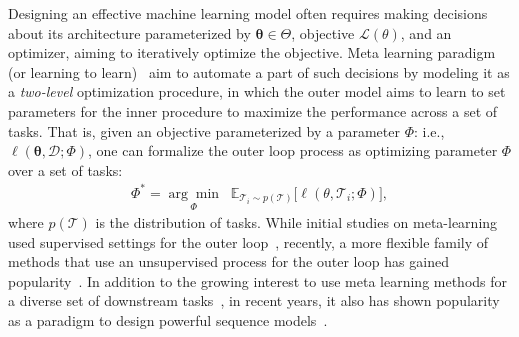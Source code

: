 Designing an effective machine learning model often requires making decisions about its architecture parameterized by $\boldsymbol{\theta} \in \Theta$, objective $\mathcal{L}(\theta)$, and an optimizer, aiming to iteratively optimize the objective. Meta learning paradigm (or learning to learn)~\citep{schmidhuber1996simple, finn2017model, akyurek2022learning, irie2025metalearning} aim to automate a part of such decisions by modeling it as a \emph{two-level} optimization procedure, in which the outer model aims to learn to set parameters for the inner procedure to maximize the performance across a set of tasks. That is, given an objective parameterized by a parameter $\Phi$: i.e., $\ell(\boldsymbol{\theta}, \mathcal{D}; \Phi)$, one can formalize the outer loop process as optimizing parameter $\Phi$ over a set of tasks:
\begin{align}
    \Phi^{\ast} =
\underset{\Phi}{\arg\min}
\;\;
\mathbb{E}_{\mathcal{T}_i \sim p(\mathcal{T})}
\Biggl[
    \ell(\theta, \mathcal{T}_i; \Phi)
\Biggr],
\end{align}
where $p(\mathcal{T})$ is the distribution of tasks. While initial studies on meta-learning used supervised settings for the outer loop~\citep{schmidhuber1996simple}, recently, a more flexible family of methods that use an unsupervised process for the outer loop has gained popularity~\citep{brown2020language, chen2022meta, qu2025optimizing, finn2017model, akyurek2022learning}. In addition to the growing interest to use meta learning methods for a diverse set of downstream tasks~\citep{finn2017model, chen2022meta, qu2025optimizing, munkhdalai2019metalearned, irie2025metalearning}, in recent years, it also has shown popularity as a paradigm to design powerful sequence models~\citep{sun2024learning, behrouz2025Miras, behrouz2024titans}.


